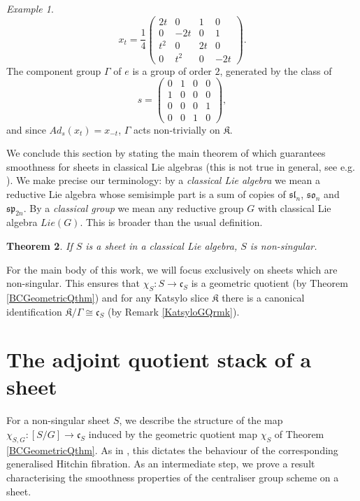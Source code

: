 \documentclass{amsart}
\newtheorem{theorem}{Theorem}
\theoremstyle{remark}
\newtheorem{example}[theorem]{Example}
\numberwithin{theorem}{section}
\numberwithin{equation}{section}
\begin{document}
\begin{example}
\begin{equation}
        x_t = \frac{1}{4}\begin{pmatrix}
            2t & 0 & 1 & 0 \\
            0 & -2t & 0 & 1 \\
            t^2 & 0 & 2t & 0 \\
            0 & t^2 & 0 & -2t
        \end{pmatrix}.
    \end{equation}
    The component group $\Gamma$ of $e$ is a group of order $2$, generated by the class of
    $$s= \begin{pmatrix}
        0 & 1 & 0 & 0 \\
        1 & 0 & 0 & 0 \\
        0 & 0 & 0 & 1 \\
        0 & 0 & 1 & 0
    \end{pmatrix},$$
    and since $Ad_s(x_t) = x_{-t}$, $\Gamma$ acts non-trivially on $\mathfrak{K}$.
    \end{example}

    We conclude this section by stating the main theorem of \cite{ImHof} which guarantees smoothness for sheets in classical Lie algebras (this is not true in general, see e.g. \cite[8.11]{Slodowy}). We make precise our terminology: by a \emph{classical Lie algebra} we mean a reductive Lie algebra whose semisimple part is a sum of copies of $\mathfrak{sl}_n$, $\mathfrak{so}_n$ and $\mathfrak{sp}_{2n}$. By a \emph{classical group} we mean any reductive group $G$ with classical Lie algebra $Lie(G)$. This is broader than the usual definition.

    \begin{theorem}\label{ClassicalSheetsthm}\cite{ImHof}
        If $S$ is a sheet in a classical Lie algebra, $S$ is non-singular.
    \end{theorem}
    
    For the main body of this work, we will focus exclusively on sheets which are non-singular. This ensures that $\chi_S:S \rightarrow \mathfrak{c}_S$ is a geometric quotient (by Theorem \ref{BCGeometricQthm}) and for any Katsylo slice $\mathfrak{K}$ there is a canonical identification $\mathfrak{K}/\Gamma \cong \mathfrak{c}_S$ (by Remark \ref{KatsyloGQrmk}).
\section{The adjoint quotient stack of a sheet}\label{AdjointQscn}
For a non-singular sheet $S$, we describe the structure of the map $\chi_{S,G}:[S/G] \rightarrow \mathfrak{c}_S$ induced by the geometric quotient map $\chi_S$ of Theorem \ref{BCGeometricQthm}. As in \cite{Ngo3}, this dictates the behaviour of the corresponding generalised Hitchin fibration. As an intermediate step, we prove a result characterising the smoothness properties of the centraliser group scheme on a sheet.
\end{document}
